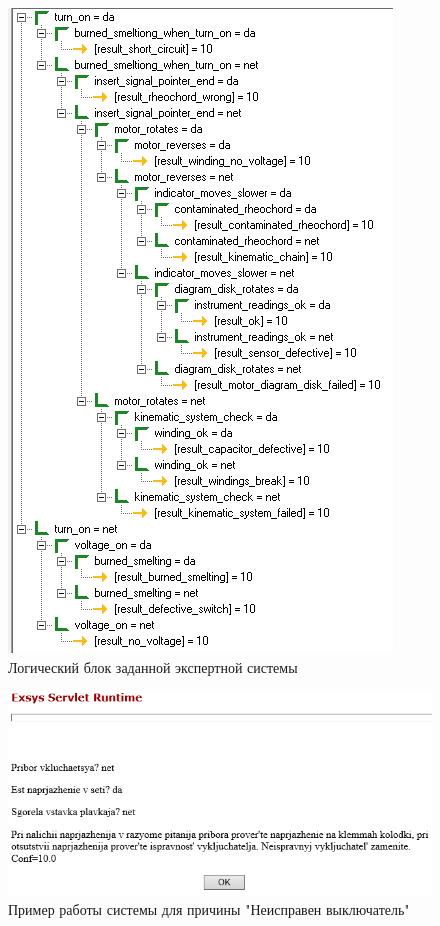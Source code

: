 \documentclass[14pt,a4paper,report]{report}
\begin{document}
\clearpage

\begin{figure}[h!]
	\centering
	\includegraphics[scale = 1.35]{images/7_0.png}
	\caption{Логический блок заданной экспертной системы}
\end{figure}

\clearpage

\begin{figure}[h!]
	\centering
	\includegraphics[scale = 0.7]{images/7_1.png}
	\caption{Пример работы системы для причины "Неисправен выключатель"}
\end{figure}
\end{document}
